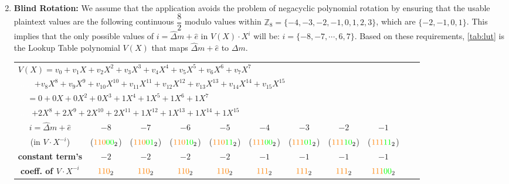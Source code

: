 \begin{enumerate}
$ $

\item \textbf{Blind Rotation:} We assume that the application avoids the problem of negacyclic polynomial rotation by ensuring that the usable plaintext values are the following continuous $\dfrac{8}{2}$ modulo values within $\mathbb{Z}_8 = \{-4, -3, -2, -1, 0, 1, 2, 3\}$, which are $\{-2, -1, 0, 1\}$. This implies that the only possible values of $i=\hat\Delta m + \hat e$ in $V(X)\cdot X^{i}$ will be: $i = \{-8, -7, \cdots, 6, 7\}$. Based on these requirements, \autoref{tab:lut} is the Lookup Table polynomial $V(X)$ that maps $\hat{\Delta} m + \hat{e}$ to $\Delta m$. 


\begin{table}[h]
\centering
\footnotesize
\begin{tabular}{|c||c|c|c|c|c|c|c|c|c|c|} %
\hline
\multicolumn{10}{|l|}{$V(X) = v_0 + v_1X + v_2X^2 + v_3X^3 + v_4X^4 + v_5X^5 + v_6X^6 + v_7X^7$}  \\ 
\multicolumn{10}{|l|}{\textcolor{white}{......} $ + v_8X^8 + v_9X^9 + v_{10}X^{10} + v_{11}X^{11} + v_{12}X^{12} + v_{13}X^{13} + v_{14}X^{14} + v_{15}X^{15}$}  \\ 
\multicolumn{10}{|l|}{\textcolor{white}{....}$= 0 + 0X +0X^2 +0X^3 +1X^4 +1X^5 +1X^6 +1X^7$}  \\ 
\multicolumn{10}{|l|}{\textcolor{white}{......}$+ 2X^8  + 2X^9 + 2X^{10} + 2X^{11} + 1X^{12} + 1X^{13} + 1X^{14} + 1X^{15}$} \\ 
\hline
\hline
\textbf{\boldmath$i = \hat{\Delta}m + \hat{e}$} & $-8$ & $-7$ & $-6$ & $-5$ & $-4$ & $-3$ & $-2$ & $-1$ \\
(in $V \cdot X^{-i}$) & ($\textcolor{cyan}{}\textcolor{orange}{110}\textcolor{green}{00}_2$) & ($\textcolor{cyan}{}\textcolor{orange}{110}\textcolor{green}{01}_2$) & ($\textcolor{cyan}{}\textcolor{orange}{110}\textcolor{green}{10}_2$) & ($\textcolor{cyan}{}\textcolor{orange}{110}\textcolor{green}{11}_2$) & ($\textcolor{cyan}{}\textcolor{orange}{111}\textcolor{green}{00}_2$) & ($\textcolor{cyan}{}\textcolor{orange}{111}\textcolor{green}{01}_2$) & ($\textcolor{cyan}{}\textcolor{orange}{111}\textcolor{green}{10}_2$) & ($\textcolor{cyan}{}\textcolor{orange}{111}\textcolor{green}{11}_2$)\\
\hline
\textbf{constant term's} & $-2$ & $-2$ & $-2$ & $-2$ & $-1$ & $-1$ & $-1$ & $-1$ \\
 \textbf{coeff. of $V\cdot X^{-i}$}& $\textcolor{orange}{110}_2$ & $\textcolor{orange}{110}_2$ & $\textcolor{orange}{110}_2$ & $\textcolor{orange}{110}_2$ & $\textcolor{orange}{111}_2$ & $\textcolor{orange}{111}_2$ & $\textcolor{orange}{111}_2$ & $\textcolor{orange}{111}\textcolor{green}{00}_2$ \\

\end{tabular}
\end{table}
\end{enumerate}
